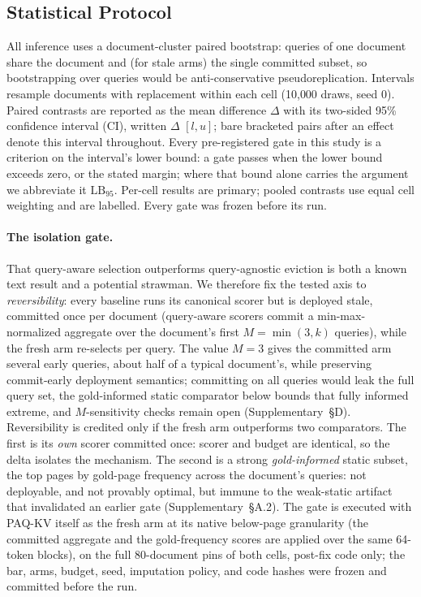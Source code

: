 \documentclass[letterpaper]{article} %
\newcommand{\paqc}{\textsc{PAQ-KV}}
\newcommand{\lb}{\mathrm{LB}_{95}}
\begin{document}
\subsection{Statistical Protocol}\label{sec:setup-stats}
All inference uses a document-cluster paired bootstrap: queries of one
document share the document and (for stale arms) the single committed subset,
so bootstrapping over queries would be anti-conservative pseudoreplication.
Intervals resample documents with replacement within each cell (10{,}000
draws, seed 0). Paired contrasts are reported as the mean difference $\Delta$
with its two-sided 95\% confidence interval (CI), written $\Delta$ $[l, u]$;
bare bracketed pairs after an effect denote this interval throughout. Every
pre-registered gate in this study is a criterion on the interval's lower
bound: a gate passes when the lower bound exceeds zero, or the stated
margin; where that bound alone carries the argument we abbreviate it $\lb$. Per-cell
results are primary; pooled contrasts use equal cell weighting and are
labelled. Every gate was frozen before its run.

\paragraph{The isolation gate.} That query-aware selection outperforms
query-agnostic eviction is both a known text result \citep{tang2024quest} and
a potential strawman. We therefore fix the tested axis to \emph{reversibility}:
every baseline runs its canonical scorer but is deployed stale, committed once
per document (query-aware scorers commit a min-max-normalized aggregate over
the document's first $M=\min(3,k)$ queries), while the fresh arm re-selects
per query. The value $M{=}3$ gives the committed arm several early queries,
about half of a typical document's, while preserving commit-early deployment
semantics; committing on all queries would leak the full query set, the
gold-informed static comparator below bounds that fully informed extreme,
and $M$-sensitivity checks remain open (Supplementary~\S D). Reversibility
is credited only if the fresh arm outperforms two
comparators. The first is its \emph{own} scorer committed once: scorer and
budget are identical, so the delta isolates the mechanism. The second is a
strong \emph{gold-informed} static subset, the top pages by gold-page
frequency across the document's queries: not deployable, and not provably
optimal, but immune to the weak-static artifact that invalidated an earlier
gate (Supplementary~\S A.2). The gate is executed with \paqc{} itself as the fresh
arm at its native below-page granularity (the committed aggregate and the
gold-frequency scores are applied over the same 64-token blocks), on the full
80-document pins of both cells, post-fix code only; the bar, arms, budget,
seed, imputation policy, and code hashes were frozen and committed before
the run.
\end{document}

